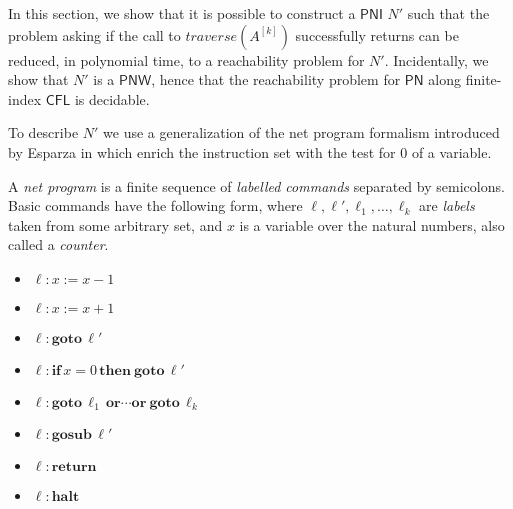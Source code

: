 \documentclass{fsttcs}
\def\cfl{\mathsf{CFL}}
\def\pn{\mathsf{PN}}
\def\pni{\mathsf{PNI}}
\def\pnw{\mathsf{PNW}}
\begin{document}
 In this section, we  show that it is possible to construct a $\pni$ $N'$ such
that  the problem asking if the call to
\(\mathit{traverse}(A^{[k]})\) successfully returns  can be reduced, in
polynomial time, to a reachability problem for $N'$.
Incidentally, we show that \(N'\) is a \(\pnw\), hence that the reachability problem for $\pn$ along
finite-index $\cfl$ is decidable.

To describe \(N'\) we use a generalization of the net program formalism introduced
by Esparza in \cite{esparza-course} which enrich the instruction set with the test for 0 of a variable.

A \emph{net program} is a finite sequence of \emph{labelled commands} separated by
semicolons.  Basic commands have the following form, where
\(\ell,\ell',\ell_1,\ldots,\ell_k\) are \emph{labels} taken from some arbitrary set,
and \(x\) is a variable over the natural numbers, also called a \emph{counter}.

\medskip

\begin{minipage}[t]{.25\textwidth}
	\begin{itemize}
		\item[] \(\ell\colon x:=x-1\) 
		\item[] \(\ell\colon x:=x+1\) 
		\item[] \(\ell\colon \mathbf{goto} \,\ell'\)
	\end{itemize}
\end{minipage}\begin{minipage}[t]{.35\textwidth}
	\begin{itemize}
		\item[] \(\ell\colon \mathbf{if}\, x=0 \, \mathbf{then\ goto}\, \ell' \) 
		\item[] \(\ell\colon \mathbf{goto} \,\ell_1\, \mathbf{or}\cdots \mathbf{or\ goto}\, \ell_k\)
		\item[] \(\ell\colon \mathbf{gosub}\, \ell'\)
	\end{itemize}
\end{minipage}\hfill \begin{minipage}[t]{.20\textwidth}
	\begin{itemize}
		\item[] \(\ell\colon \mathbf{return}\)
		\item[] \(\ell\colon \mathbf{halt}\)
	\end{itemize}
\end{minipage}
\end{document}
